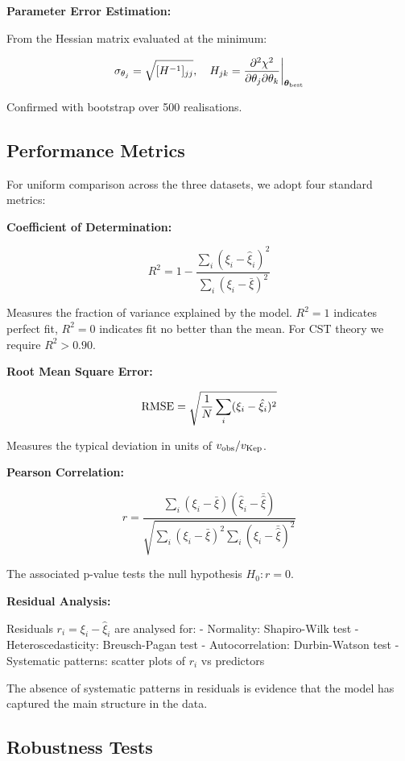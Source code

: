 \documentclass[10pt,a4paper]{article}
\begin{document}
\textbf{Parameter Error Estimation:}

From the Hessian matrix evaluated at the minimum:

\[\sigma_{\theta_j} = \sqrt{[H^{-1}]_{jj}}, \quad H_{jk} = \frac{\partial^2 \chi^2}{\partial\theta_j \partial\theta_k}\bigg|_{\boldsymbol\theta_{\rm best}}\]

Confirmed with bootstrap over 500 realisations.

\subsection{Performance Metrics}\label{performance-metrics}

For uniform comparison across the three datasets, we adopt four standard
metrics:

\textbf{Coefficient of Determination:}

\[R^2 = 1 - \frac{\sum_i (\xi_i - \hat\xi_i)^2}{\sum_i (\xi_i - \bar\xi)^2}\]

Measures the fraction of variance explained by the model. \(R^2 = 1\)
indicates perfect fit, \(R^2 = 0\) indicates fit no better than the
mean. For CST theory we require \(R^2 > 0.90\).

\textbf{Root Mean Square Error:}

\[{\rm RMSE} = \sqrt{\frac{1}{N}\sum_i (\xi_i - \hat\xi_i)^2}\]

Measures the typical deviation in units of \(v_{\rm obs}/v_{\rm Kep}\).

\textbf{Pearson Correlation:}

\[r = \frac{\sum_i (\xi_i - \bar\xi)(\hat\xi_i - \bar{\hat\xi})}{\sqrt{\sum_i (\xi_i-\bar\xi)^2 \sum_i (\hat\xi_i - \bar{\hat\xi})^2}}\]

The associated p-value tests the null hypothesis \(H_0: r = 0\).

\textbf{Residual Analysis:}

Residuals \(r_i = \xi_i - \hat\xi_i\) are analysed for: - Normality:
Shapiro-Wilk test - Heteroscedasticity: Breusch-Pagan test -
Autocorrelation: Durbin-Watson test - Systematic patterns: scatter plots
of \(r_i\) vs predictors

The absence of systematic patterns in residuals is evidence that the
model has captured the main structure in the data.

\subsection{Robustness Tests}\label{robustness-tests}
\end{document}
